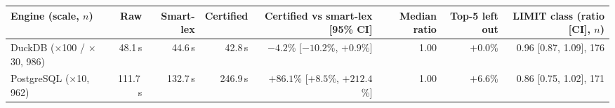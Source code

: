 \begin{tabular}{@{}lrrrrrrr@{}}
\toprule
Engine (scale, $n$) & Raw & Smart-lex & Certified & Certified vs smart-lex [95\% CI] & Median ratio & Top-5 left out & LIMIT class (ratio [CI], $n$) \\
\midrule
DuckDB ($\times$100 / $\times$30, 986) & 48.1\,s & 44.6\,s & 42.8\,s & $-4.2$\% [$-10.2$\%, $+0.9$\%] & 1.00 & $+0.0$\% & 0.96 [0.87, 1.09], 176 \\
PostgreSQL ($\times$10, 962) & 111.7\,s & 132.7\,s & 246.9\,s & $+86.1$\% [$+8.5$\%, $+212.4$\%] & 1.00 & $+6.6$\% & 0.86 [0.75, 1.02], 171 \\
\bottomrule
\end{tabular}
